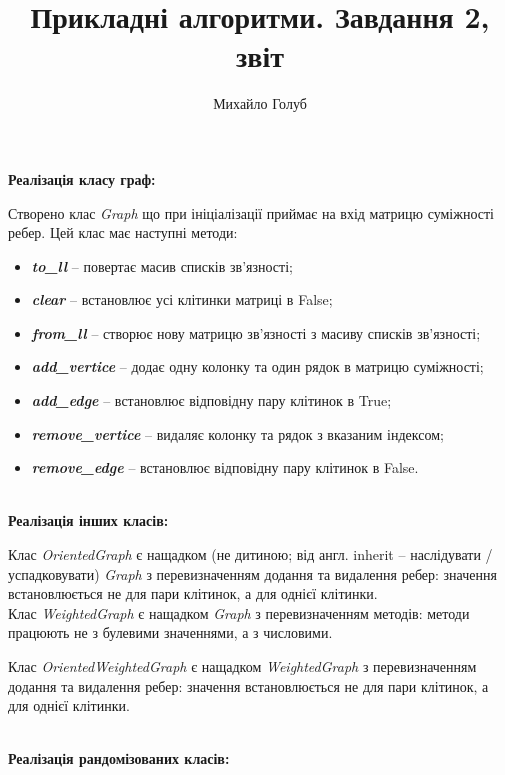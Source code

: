 \documentclass{article}
\title{Прикладні алгоритми. Завдання 2, звіт}
\author{Михайло Голуб}
\begin{document}
\maketitle
\newpage

\textbf{Реалізація класу граф:}\\\indent

Створено клас \textit{Graph} що при ініціалізації приймає на вхід матрицю суміжності ребер. Цей клас має наступні методи:
\begin{itemize}
\item[] \textbf{\textit{to\_ll}} -- повертає масив списків зв'язності;
\item[] \textbf{\textit{clear}} -- встановлює усі клітинки матриці в False;
\item[] \textbf{\textit{from\_ll}} -- створює нову матрицю зв'язності з масиву списків зв'язності;
\item[] \textbf{\textit{add\_vertice}} -- додає одну колонку та один рядок в матрицю суміжності;
\item[] \textbf{\textit{add\_edge}} -- встановлює відповідну пару клітинок в True;
\item[] \textbf{\textit{remove\_vertice}} -- видаляє колонку та рядок з вказаним індексом;
\item[] \textbf{\textit{remove\_edge}} -- встановлює відповідну пару клітинок в False.\\\\
\end{itemize}

\textbf{Реалізація інших класів:}\\\indent

Клас \textit{OrientedGraph} є нащадком (не дитиною; від англ. inherit -- наслідувати / успадковувати) \textit{Graph} з перевизначенням додання та видалення ребер: значення встановлюється не для пари клітинок, а для однієї клітинки.\\\indent
Клас \textit{WeightedGraph} є нащадком \textit{Graph} з перевизначенням методів: методи працюють не з булевими значеннями, а з числовими.\\\indent

Клас \textit{OrientedWeightedGraph} є нащадком \textit{WeightedGraph} з перевизначенням додання та видалення ребер: значення встановлюється не для пари клітинок, а для однієї клітинки.\\\\\indent

\textbf{Реалізація рандомізованих класів:}\\\indent
\end{document}
